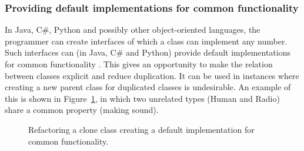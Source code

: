 \subsubsection{Providing default implementations for common functionality}
In Java, C\#, Python and possibly other object-oriented languages, the programmer can create interfaces of which a class can implement any number. Such interfaces can (in Java, C\# and Python) provide default implementations for common functionality \cite{mohnen2002interfaces}. This gives an opportunity to make the relation between classes explicit and reduce duplication. It can be used in instances where creating a new parent class for duplicated classes is undesirable. An example of this is shown in Figure~\ref{fig:createinterfaceabstraction}, in which two unrelated types (Human and Radio) share a common property (making sound).

\begin{figure}[H]
\begin{parcolumns}{2}
\end{parcolumns}
\caption{Refactoring a clone class creating a default implementation for common functionality.}
\label{fig:createinterfaceabstraction}
\end{figure}

